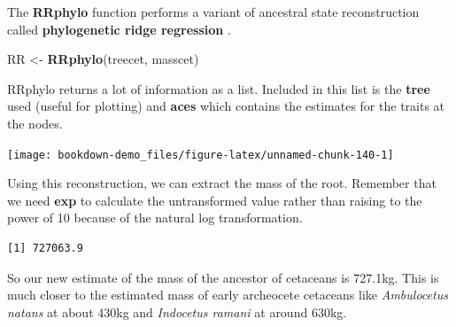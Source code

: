 \documentclass[
]{book}
\newenvironment{Shaded}{\begin{snugshade}}{\end{snugshade}}
\newcommand{\DataTypeTok}[1]{\textcolor[rgb]{0.13,0.29,0.53}{#1}}
\newcommand{\DecValTok}[1]{\textcolor[rgb]{0.00,0.00,0.81}{#1}}
\newcommand{\FloatTok}[1]{\textcolor[rgb]{0.00,0.00,0.81}{#1}}
\newcommand{\KeywordTok}[1]{\textcolor[rgb]{0.13,0.29,0.53}{\textbf{#1}}}
\newcommand{\NormalTok}[1]{#1}
\newcommand{\OperatorTok}[1]{\textcolor[rgb]{0.81,0.36,0.00}{\textbf{#1}}}
\newcommand{\OtherTok}[1]{\textcolor[rgb]{0.56,0.35,0.01}{#1}}
\newcommand{\StringTok}[1]{\textcolor[rgb]{0.31,0.60,0.02}{#1}}
\begin{document}
The \textbf{RRphylo} function performs a variant of ancestral state reconstruction called \textbf{phylogenetic ridge regression} \citep{Castiglione20}.

\begin{Shaded}
\begin{Highlighting}[]
\NormalTok{RR \textless{}{-}}\StringTok{ }\KeywordTok{RRphylo}\NormalTok{(treecet, masscet)}
\end{Highlighting}
\end{Shaded}

RRphylo returns a lot of information as a list. Included in this list is the \textbf{tree} used (useful for plotting) and \textbf{aces} which contains the estimates for the traits at the nodes.

\begin{Shaded}
\end{Shaded}

\begin{center}\texttt{[image: bookdown-demo\_files/figure-latex/unnamed-chunk-140-1]} \end{center}

Using this reconstruction, we can extract the mass of the root. Remember that we need \textbf{exp} to calculate the untransformed value rather than raising to the power of 10 because of the natural log transformation.

\begin{Shaded}
\end{Shaded}

\begin{verbatim}
[1] 727063.9
\end{verbatim}

So our new estimate of the mass of the ancestor of cetaceans is 727.1kg. This is much closer to the estimated mass of early archeocete cetaceans like \emph{Ambulocetus natans} at about 430kg and \emph{Indocetus ramani} at around 630kg.
\end{document}
